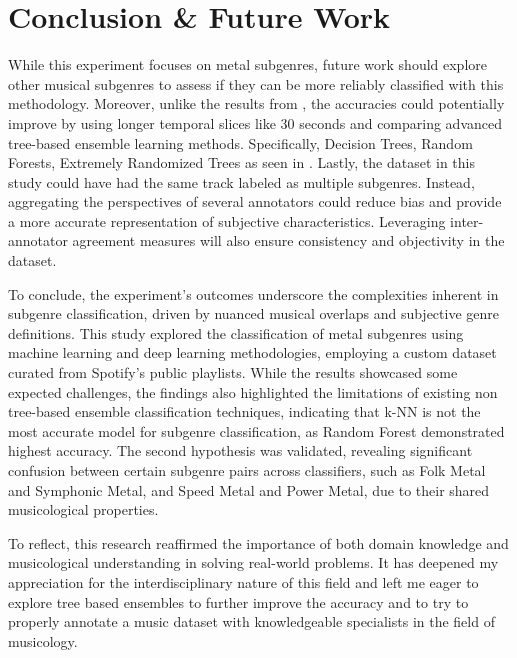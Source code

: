 \section{Conclusion \& Future Work}
While this experiment focuses on metal subgenres, future work should explore other musical subgenres to assess if they can be more reliably classified with this methodology. Moreover, unlike the results from \cite{ndou2021music}, the accuracies could potentially improve by using longer temporal slices like 30 seconds and comparing advanced tree-based ensemble learning methods. Specifically, Decision Trees, Random Forests, Extremely Randomized Trees as seen in \cite{doi:10.1080/09298215.2020.1761399}. Lastly, the dataset in this study could have had the same track labeled as multiple subgenres. Instead, aggregating the perspectives of several annotators could reduce bias and provide a more accurate representation of subjective characteristics. Leveraging inter-annotator agreement measures will also ensure consistency and objectivity in the dataset.

To conclude, the experiment's outcomes underscore the complexities inherent in subgenre classification, driven by nuanced musical overlaps and subjective genre definitions. This study explored the classification of metal subgenres using machine learning and deep learning methodologies, employing a custom dataset curated from Spotify's public playlists. While the results showcased some expected challenges, the findings also highlighted the limitations of existing non tree-based ensemble classification techniques, indicating that k-NN is not the most accurate model for subgenre classification, as Random Forest demonstrated highest accuracy. The second hypothesis was validated, revealing significant confusion between certain subgenre pairs across classifiers, such as Folk Metal and Symphonic Metal, and Speed Metal and Power Metal, due to their shared musicological properties.

To reflect, this research reaffirmed the importance of both domain knowledge and musicological understanding in solving real-world problems. It has deepened my appreciation for the interdisciplinary nature of this field and left me eager to explore tree based ensembles to further improve the accuracy and to try to properly annotate a music dataset with knowledgeable specialists in the field of musicology.

